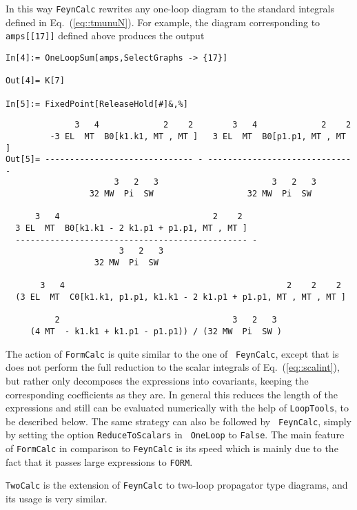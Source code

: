 In this way {\tt FeynCalc} rewrites any one-loop diagram to the standard
integrals defined in Eq.~(\ref{eq::tmunuN}).  For example, the diagram
corresponding to {\tt amps[[17]]} defined above produces the output
\begin{verbatim}
In[4]:= OneLoopSum[amps,SelectGraphs -> {17}]

Out[4]= K[7]

In[5]:= FixedPoint[ReleaseHold[#]&,%]
\end{verbatim}
\pagebreak[4]
\begin{verbatim}
              3   4             2    2        3   4             2    2
         -3 EL  MT  B0[k1.k1, MT , MT ]   3 EL  MT  B0[p1.p1, MT , MT ]
Out[5]= ------------------------------ - ----------------------------- - 
                      3   2   3                       3   2   3
                 32 MW  Pi  SW                   32 MW  Pi  SW
 
      3   4                               2    2
  3 EL  MT  B0[k1.k1 - 2 k1.p1 + p1.p1, MT , MT ]
  ----------------------------------------------- - 
                       3   2   3
                  32 MW  Pi  SW
 
       3   4                                             2    2    2
  (3 EL  MT  C0[k1.k1, p1.p1, k1.k1 - 2 k1.p1 + p1.p1, MT , MT , MT ] 
 
          2                                   3   2   3
     (4 MT  - k1.k1 + k1.p1 - p1.p1)) / (32 MW  Pi  SW )
\end{verbatim}
The action of {\tt FormCalc} is quite similar to the one of {\tt
  FeynCalc}, except that is does not perform the full reduction to the
scalar integrals of Eq.~(\ref{eq::scalint}), but rather only decomposes
the expressions into covariants, keeping the corresponding coefficients
as they are. In general this reduces the length of the expressions and
still can be evaluated numerically with the help of {\tt LoopTools}, to
be described below. The same strategy can also be followed by {\tt
  FeynCalc}, simply by setting the option {\tt ReduceToScalars} in {\tt
  OneLoop} to {\tt False}.  The main feature of {\tt FormCalc} in
comparison to {\tt FeynCalc} is its speed which is mainly due to the
fact that it passes large expressions to {\tt FORM}.

{\tt TwoCalc} is the extension of {\tt FeynCalc} to two-loop propagator
type diagrams, and its usage is very similar.

